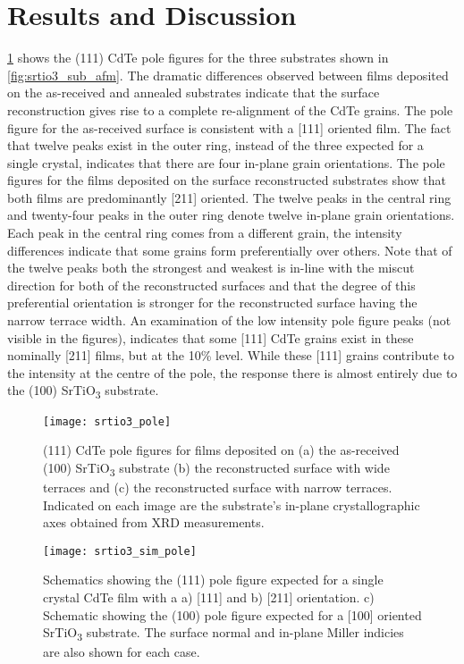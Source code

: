 \section{Results and Discussion}
\cref{fig:srtio3_pole} shows the (111) CdTe pole figures for the three substrates
shown in \cref{fig:srtio3_sub_afm}. The dramatic differences observed between films
deposited on the as-received and annealed substrates indicate that
the surface reconstruction gives rise to a complete re-alignment of
the CdTe grains. The pole figure for the as-received surface is
consistent with a [111] oriented film. The fact that twelve peaks
exist in the outer ring, instead of the three expected for a single
crystal, indicates that there are four in-plane grain orientations.
The pole figures for the films deposited on the surface reconstructed substrates show that both films are predominantly [211]
oriented. The twelve peaks in the central ring and twenty-four
peaks in the outer ring denote twelve in-plane grain orientations. Each peak in the central ring comes from a different grain, the intensity differences indicate that some grains form
preferentially over others. Note that of the twelve peaks both
the strongest and weakest is in-line with the miscut direction for
both of the reconstructed surfaces and that the degree of this
preferential orientation is stronger for the reconstructed surface
having the narrow terrace width. An examination of the low
intensity pole figure peaks (not visible in the figures), indicates that
some [111] CdTe grains exist in these nominally [211] films, but
at the 10\% level. While these [111] grains contribute to
the intensity at the centre of the pole, the response there is almost
entirely due to the (100) SrTiO\textsubscript{3} substrate.
\begin{figure}
    \centering
    \texttt{[image: srtio3\_pole]}
    \caption[Pole figures of CdTe grown on SrTiO\textsubscript{3}]{\label{fig:srtio3_pole}(111) CdTe pole figures for films deposited on (a) the as-received (100) SrTiO\textsubscript{3} substrate (b) the reconstructed surface with wide terraces and (c) the reconstructed surface with narrow terraces. Indicated on each image are the substrate’s in-plane crystallographic axes obtained from XRD measurements.}
\end{figure}
\begin{figure}
    \centering
    \texttt{[image: srtio3\_sim\_pole]}
    \caption{\label{fig:srtio3_sim_pole}Schematics showing the (111) pole figure expected for a single crystal CdTe film with a a) [111] and b) [211] orientation. c) Schematic showing the (100) pole figure expected for a [100] oriented SrTiO\textsubscript{3} substrate. The surface normal and in-plane Miller indicies are also shown for each case.}
\end{figure}

